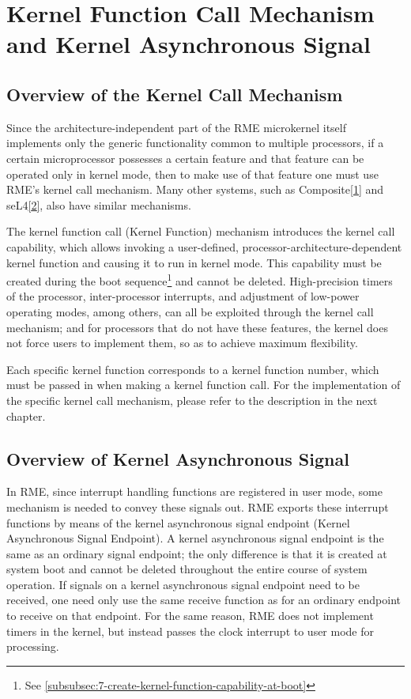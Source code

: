 \chapter{Kernel Function Call Mechanism and Kernel Asynchronous Signal}\label{ch:kernel-call-and-async-signal}

\section{Overview of the Kernel Call Mechanism}\label{sec:6-kernel-call-overview}

Since the architecture-independent part of the RME microkernel itself implements only the generic functionality common to multiple processors, if a certain microprocessor possesses a certain feature and that feature can be operated only in kernel mode, then to make use of that feature one must use RME's kernel call mechanism. Many other systems, such as Composite\hyperref[cite:6-1]{{[}1{]}} and seL4\hyperref[cite:6-2]{{[}2{]}}, also have similar mechanisms.

The kernel function call (Kernel Function) mechanism introduces the kernel call capability, which allows invoking a user-defined, processor-architecture-dependent kernel function and causing it to run in kernel mode. This capability must be created during the boot sequence\footnote{See \ref{subsubsec:7-create-kernel-function-capability-at-boot}} and cannot be deleted. High-precision timers of the processor, inter-processor interrupts, and adjustment of low-power operating modes, among others, can all be exploited through the kernel call mechanism; and for processors that do not have these features, the kernel does not force users to implement them, so as to achieve maximum flexibility.

Each specific kernel function corresponds to a kernel function number, which must be passed in when making a kernel function call. For the implementation of the specific kernel call mechanism, please refer to the description in the next chapter.

\section{Overview of Kernel Asynchronous Signal}\label{sec:6-async-signal-overview}

In RME, since interrupt handling functions are registered in user mode, some mechanism is needed to convey these signals out. RME exports these interrupt functions by means of the kernel asynchronous signal endpoint (Kernel
Asynchronous Signal
Endpoint). A kernel asynchronous signal endpoint is the same as an ordinary signal endpoint; the only difference is that it is created at system boot and cannot be deleted throughout the entire course of system operation. If signals on a kernel asynchronous signal endpoint need to be received, one need only use the same receive function as for an ordinary endpoint to receive on that endpoint. For the same reason, RME does not implement timers in the kernel, but instead passes the clock interrupt to user mode for processing.

